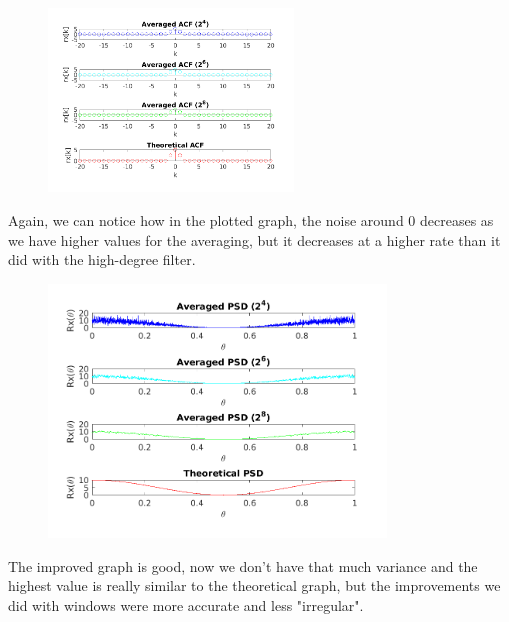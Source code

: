 \documentclass[a4paper,11pt]{article}
\begin{document}
\begin{figure}[!hp]
    \begin{center}
      \includegraphics[width=0.58\textwidth]{images/study2/acf_ld_aver_stem.png}
    \end{center}
\end{figure}

Again, we can notice how in the plotted graph, the noise around 0 decreases
as we have higher values for the averaging, but it decreases at a higher rate
than it did with the high-degree filter.

\newpage

\begin{figure}[!hp]
    \begin{center}
      \includegraphics[width=0.8\textwidth]{images/study2/psd_ld_aver.png}
    \end{center}
\end{figure}

The improved graph is good, now we don't have that much variance and the
highest value is really similar to the theoretical graph, but the improvements
we did with windows were more accurate and less "irregular". \\
\end{document}
